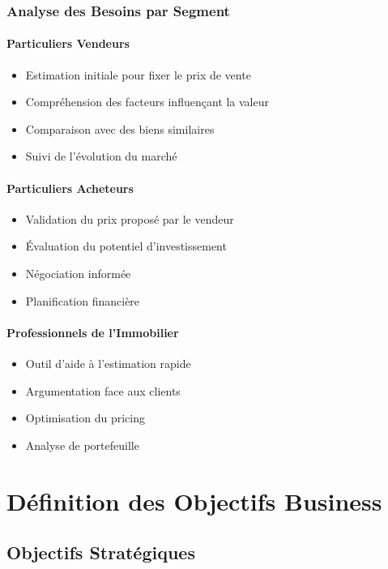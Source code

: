 \subsubsection{Analyse des Besoins par Segment}

\paragraph{Particuliers Vendeurs}
\begin{itemize}
    \item Estimation initiale pour fixer le prix de vente
    \item Compréhension des facteurs influençant la valeur
    \item Comparaison avec des biens similaires
    \item Suivi de l'évolution du marché
\end{itemize}

\paragraph{Particuliers Acheteurs}
\begin{itemize}
    \item Validation du prix proposé par le vendeur
    \item Évaluation du potentiel d'investissement
    \item Négociation informée
    \item Planification financière
\end{itemize}

\paragraph{Professionnels de l'Immobilier}
\begin{itemize}
    \item Outil d'aide à l'estimation rapide
    \item Argumentation face aux clients
    \item Optimisation du pricing
    \item Analyse de portefeuille
\end{itemize}

\section{Définition des Objectifs Business}
\label{sec:objectifs_business}

\subsection{Objectifs Stratégiques}
\label{subsec:objectifs_strategiques}

